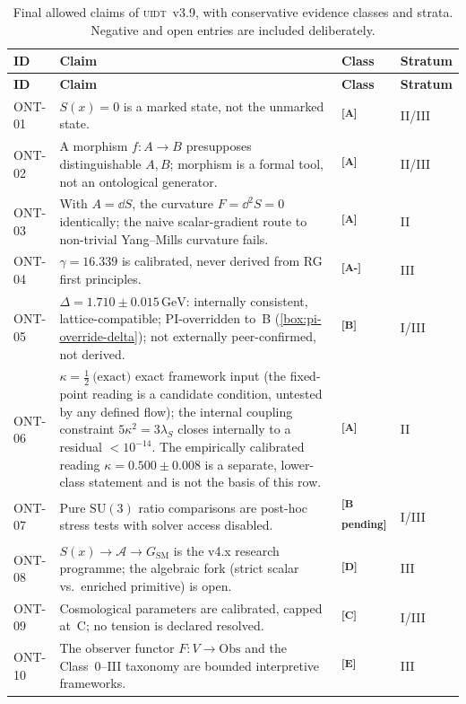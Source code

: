\documentclass[12pt,a4paper,twoside]{article}
\theoremstyle{plain}
\theoremstyle{definition}
\theoremstyle{remark}
\newcommand{\UIDT}{\textsc{uidt}}
\newcommand{\GeV}{\,\mathrm{GeV}}
\newcommand{\catmark}[1]{\textsuperscript{\textsf{\textbf{[#1]}}}}
\newcommand{\DeltaGap}{1.710 \pm 0.015\GeV} %
\newcommand{\GammaGeom}{16.339} %
\newcommand{\KappaRG}{\tfrac{1}{2}\ \text{(exact)}} %
\begin{document}
{\small
\renewcommand{\arraystretch}{1.3}
\begin{longtable}{p{} p{} p{} p{}}
\caption{Final allowed claims of \UIDT\ v3.9, with conservative evidence classes
and strata. Negative and open entries are included deliberately.}
\label{tab:claims}\\
\toprule
\textbf{ID} & \textbf{Claim} & \textbf{Class} & \textbf{Stratum} \\
\midrule
\endfirsthead
\toprule
\textbf{ID} & \textbf{Claim} & \textbf{Class} & \textbf{Stratum} \\
\midrule
\endhead
\bottomrule
\endfoot
ONT-01 & $S(x)=0$ is a marked state, not the unmarked state. & \catmark{A} & II/III \\
ONT-02 & A morphism $f\colon A\to B$ presupposes distinguishable $A,B$; morphism is a formal tool, not an ontological generator. & \catmark{A} & II/III \\
ONT-03 & With $A=\dd S$, the curvature $F=\dd^2 S=0$ identically; the naive scalar-gradient route to non-trivial Yang--Mills curvature fails. & \catmark{A} & II \\
ONT-04 & $\gamma = \GammaGeom$ is calibrated, never derived from RG first principles. & \catmark{A-} & III \\
ONT-05 & $\Delta = \DeltaGap$: internally consistent, lattice-compatible; PI-overridden to~B (\cref{box:pi-override-delta}); not externally peer-confirmed, not derived. & \catmark{B} & I/III \\
ONT-06 & $\kappa = \KappaRG$ exact framework input (the fixed-point reading is a candidate condition, untested by any defined flow); the internal coupling constraint $5\kappa^2 = 3\lambda_S$ closes internally to a residual $<10^{-14}$. The empirically calibrated reading $\kappa = 0.500 \pm 0.008$ is a separate, lower-class statement and is not the basis of this row. & \catmark{A} & II \\
ONT-07 & Pure $\mathrm{SU}(3)$ ratio comparisons are post-hoc stress tests with solver access disabled. & \catmark{B\,pending} & I/III \\
ONT-08 & $S(x)\to\mathcal{A}\to G_{\mathrm{SM}}$ is the v4.x research programme; the algebraic fork (strict scalar vs.\ enriched primitive) is open. & \catmark{D} & III \\
ONT-09 & Cosmological parameters are calibrated, capped at~C; no tension is declared resolved. & \catmark{C} & I/III \\
ONT-10 & The observer functor $F\colon V\to\mathrm{Obs}$ and the Class~0--III taxonomy are bounded interpretive frameworks. & \catmark{E} & III \\
\bottomrule
\end{longtable}
}
\end{document}
